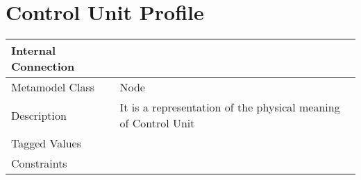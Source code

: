 \section{Control Unit Profile}

\begin{longtable}{|p{4cm}|p{9cm}|}

\hline
\textbf{Internal Connection} & \\


\hline
Metamodel Class & Node\\

\hline
Description & It is a representation of the physical meaning of Control Unit\\

\hline
Tagged Values & \\

\hline
Constraints &\\

\hline
\end{longtable}